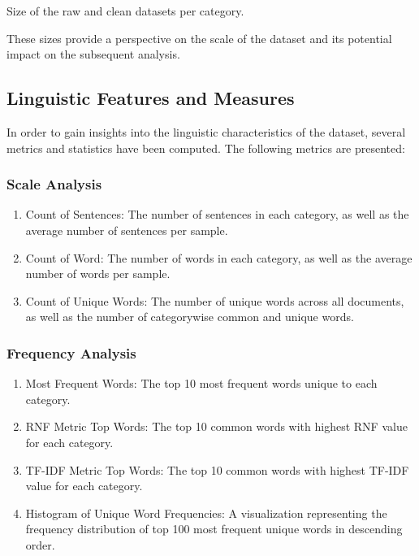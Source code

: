 \documentclass{article}
\begin{document}
\begin{table}[htbp]
  \centering
  \caption{Size of the raw and clean datasets per category.}
  \label{tab:dataset_size}
\end{table}

These sizes provide a perspective on the scale of the dataset and its potential impact on the subsequent analysis.

\subsection{Linguistic Features and Measures}
In order to gain insights into the linguistic characteristics of the dataset, several metrics and statistics have been computed.
The following metrics are presented:

\subsubsection{Scale Analysis}

\begin{enumerate}
  \item Count of Sentences: The number of sentences in each category, as well as the average number of sentences per sample.
  \item Count of Word: The number of words in each category, as well as the average number of words per sample.
  \item Count of Unique Words: The number of unique words across all documents, as well as the number of categorywise common and unique words.
\end{enumerate}

\subsubsection{Frequency Analysis}

\begin{enumerate}
  \item Most Frequent Words: The top 10 most frequent words unique to each category.
  \item RNF Metric Top Words: The top 10 common words with highest RNF value for each category.
  \item TF-IDF Metric Top Words: The top 10 common words with highest TF-IDF value for each category.
  \item Histogram of Unique Word Frequencies: A visualization representing the frequency distribution of top 100 most frequent unique words in descending order.
\end{enumerate}
\end{document}
